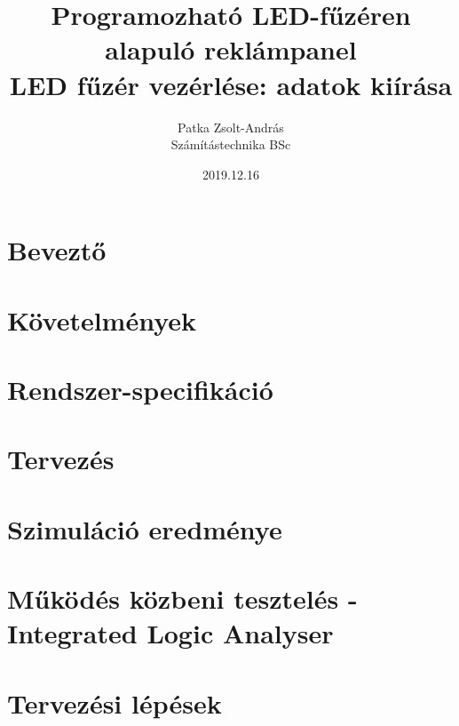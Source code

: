 \documentclass[12pt]{article}
\title{Programozható LED-fűzéren alapuló reklámpanel \\
	LED fűzér vezérlése: adatok kiírása}
\author{Patka Zsolt-András \\ Számítástechnika BSc}
\date{2019.12.16}
\begin{document}
\maketitle
{}

\newpage
\tableofcontents
\newpage

\section{Beveztő}


\section{Követelmények}


\section{Rendszer-specifikáció}


\section{Tervezés}


\section{Szimuláció eredménye}


\section{Működés közbeni tesztelés - Integrated Logic Analyser}


\newpage



\newpage
\appendix
\section{Tervezési lépések}

\end{document}
